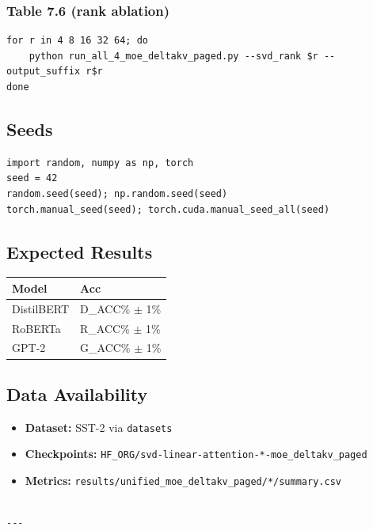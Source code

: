 \subsubsection{Table 7.6 (rank ablation)}
\begin{lstlisting}
for r in 4 8 16 32 64; do
    python run_all_4_moe_deltakv_paged.py --svd_rank $r --output_suffix r$r
done
\end{lstlisting}

\subsection{Seeds}

\begin{lstlisting}
import random, numpy as np, torch
seed = 42
random.seed(seed); np.random.seed(seed)
torch.manual_seed(seed); torch.cuda.manual_seed_all(seed)
\end{lstlisting}

\subsection{Expected Results}

\begin{table}[H]
\centering
\small
\begin{tabular}{ll}
\toprule
\textbf{Model} & \textbf{Acc} \\
\midrule
DistilBERT & {{D\_ACC}}\% $\pm$ 1\% \\
RoBERTa & {{R\_ACC}}\% $\pm$ 1\% \\
GPT-2 & {{G\_ACC}}\% $\pm$ 1\% \\
\bottomrule
\end{tabular}
\end{table}

\subsection{Data Availability}

\begin{itemize}
\item \textbf{Dataset:} SST-2 via \texttt{datasets}
\item \textbf{Checkpoints:} \texttt{{{HF\_ORG}}/svd-linear-attention-*-moe\_deltakv\_paged}
\item \textbf{Metrics:} \texttt{results/unified\_moe\_deltakv\_paged/*/summary.csv}
\end{itemize}
\begin{lstlisting}

---
\end{lstlisting}